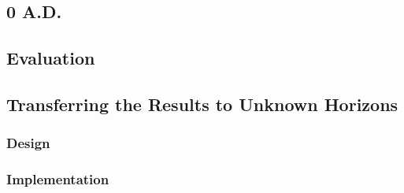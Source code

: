 \subsection{0 A.D.}

\subsection{Evaluation}

\subsection{Transferring the Results to Unknown Horizons}
\subsubsection{Design}
\subsubsection{Implementation}
